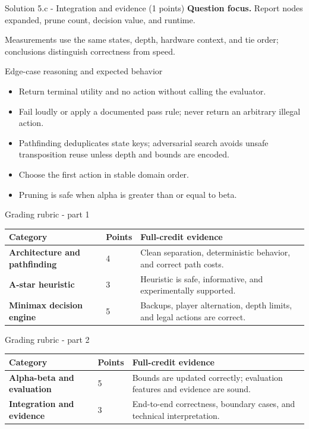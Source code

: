 \documentclass[aspectratio=169,11pt]{beamer}
\begin{document}
\begin{frame}{Solution 5.c - Integration and evidence (1 points)}
\small
\textbf{Question focus.} Report nodes expanded, prune count, decision value, and runtime.

\vspace{0.25cm}
\answerlabel Measurements use the same states, depth, hardware context, and tie order; conclusions distinguish correctness from speed.
\end{frame}

\begin{frame}{Edge-case reasoning and expected behavior}
\small
\begin{itemize}
  \item Return terminal utility and no action without calling the evaluator.
  \item Fail loudly or apply a documented pass rule; never return an arbitrary illegal action.
  \item Pathfinding deduplicates state keys; adversarial search avoids unsafe transposition reuse unless depth and bounds are encoded.
  \item Choose the first action in stable domain order.
  \item Pruning is safe when alpha is greater than or equal to beta.
\end{itemize}
\end{frame}

\begin{frame}{Grading rubric - part 1}
\scriptsize
\begin{tabularx}{\textwidth}{>{\bfseries}p{} p{} X}
\toprule
Category & Points & Full-credit evidence \\
\midrule
Architecture and pathfinding & 4 & Clean separation, deterministic behavior, and correct path costs. \\
A-star heuristic & 3 & Heuristic is safe, informative, and experimentally supported. \\
Minimax decision engine & 5 & Backups, player alternation, depth limits, and legal actions are correct. \\
\bottomrule
\end{tabularx}
\end{frame}

\begin{frame}{Grading rubric - part 2}
\scriptsize
\begin{tabularx}{\textwidth}{>{\bfseries}p{} p{} X}
\toprule
Category & Points & Full-credit evidence \\
\midrule
Alpha-beta and evaluation & 5 & Bounds are updated correctly; evaluation features and evidence are sound. \\
Integration and evidence & 3 & End-to-end correctness, boundary cases, and technical interpretation. \\
\bottomrule
\end{tabularx}
\end{frame}
\end{document}
